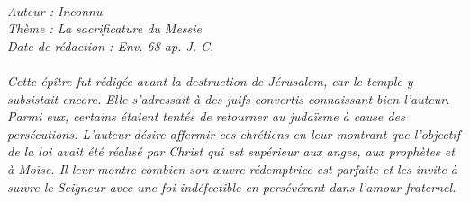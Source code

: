 \BFont
\noindent\hrulefill
{\footnotesize
\textit{
\bigskip
{\centering{}
\\Auteur : Inconnu
\\Thème : La sacrificature du Messie
\\Date de rédaction : Env. 68 ap. J.-C.\\}
}
\textit{
\\Cette épître fut rédigée avant la destruction de Jérusalem, car le temple y subsistait encore. Elle s'adressait à des juifs convertis connaissant bien l'auteur. Parmi eux, certains étaient tentés de retourner au judaïsme à cause des persécutions. L'auteur désire affermir ces chrétiens en leur montrant que l'objectif de la loi avait été réalisé par Christ qui est supérieur aux anges, aux prophètes et à Moïse. Il leur montre combien son œuvre rédemptrice est parfaite et les invite à suivre le Seigneur avec une foi indéfectible en persévérant dans l'amour fraternel.\bigskip
}
}
\par\nobreak\noindent\hrulefill

